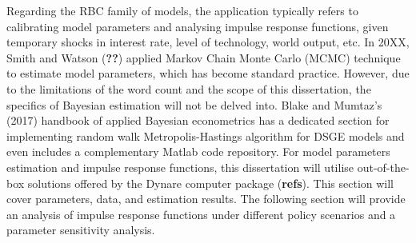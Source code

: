 Regarding the RBC family of models, the application typically refers to calibrating model parameters and analysing impulse response functions, given temporary shocks in interest rate, level of technology, world output, etc. In 20XX, Smith and Watson (\textbf{??}) applied Markov Chain Monte Carlo (MCMC) technique to estimate model parameters, which has become standard practice. However, due to the limitations of the word count and the scope of this dissertation, the specifics of Bayesian estimation will not be delved into. Blake and Mumtaz's (2017) handbook of applied Bayesian econometrics has a dedicated section for implementing random walk Metropolis-Hastings algorithm for DSGE models and even includes a complementary Matlab code repository. For model parameters estimation and impulse response functions, this dissertation will utilise out-of-the-box solutions offered by the Dynare computer package (\textbf{refs}). This section will cover parameters, data, and estimation results. The following section will provide an analysis of impulse response functions under different policy scenarios and a parameter sensitivity analysis.

